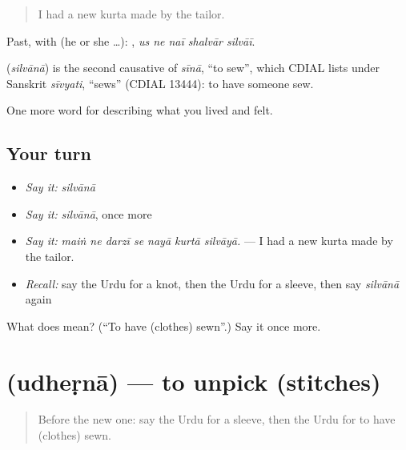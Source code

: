 \begin{quote}
I had a new kurta made by the tailor.
\end{quote}

Past, with  (he or she …):     , \emph{us ne naī shalvār silvāī}.

\begin{cousinweb}
\textbf{} (\emph{silvānā}) is the second causative of \emph{sīnā}, \textquotedblleft{}to sew\textquotedblright{}, which CDIAL lists under Sanskrit \emph{sīvyati}, \textquotedblleft{}sews\textquotedblright{} (CDIAL 13444): to have someone sew.
\end{cousinweb}

\begin{grammarlens}[title={What you've built}]
One more word for describing what you lived and felt.
\end{grammarlens}

\subsection*{Your turn}
\begin{itemize}
\raggedright
  \item \emph{Say it:} \emph{silvānā}
  \item \emph{Say it:} \emph{silvānā}, once more
  \item \emph{Say it:} \emph{maiṅ ne darzī se nayā kurtā silvāyā.} — I had a new kurta made by the tailor.
  \item \emph{Recall:} say the Urdu for a knot, then the Urdu for a sleeve, then say \emph{silvānā} again
\end{itemize}

\begin{tcolorbox}[breakable,colback=teal!4,colframe=teal!35!black,title={Before you move on}]
What does  mean? (\textquotedblleft{}To have (clothes) sewn\textquotedblright{}.) Say it once more.
\end{tcolorbox}
\section[\texorpdfstring{\ur{ادھیڑنا} (udheṛnā)}{ادھیڑنا (udheṛnā)}]{ (udheṛnā) — to unpick (stitches)}

\label{lesson:UR-C500-udherna}



\begin{quote}
Before the new one: say the Urdu for a sleeve, then the Urdu for to have (clothes) sewn.
\end{quote}


